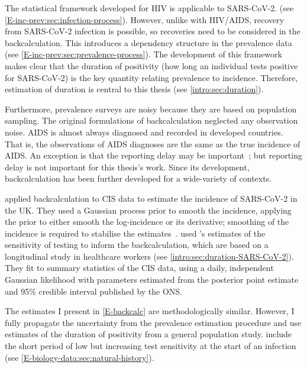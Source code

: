 \documentclass[thesis.tex]{subfiles}
\begin{document}
The statistical framework developed for HIV is applicable to SARS-CoV-2.
(see \cref{E-inc-prev:sec:infection-process}).
However, unlike with HIV/AIDS, recovery from SARS-CoV-2 infection is possible, so recoveries need to be considered in the backcalculation.
This introduces a dependency structure in the prevalence data (see \cref{E-inc-prev:sec:prevalence-process}).
The development of this framework makes clear that the duration of positivity (how long an individual tests positive for SARS-CoV-2) is the key quantity relating prevalence to incidence.
Therefore, estimation of duration is central to this thesis (see \cref{intro:sec:duration}).

Furthermore, prevalence surveys are noisy because they are based on population sampling.
The original formulations of backcalculation neglected any observation noise.
AIDS is almost always diagnosed and recorded in developed countries.
That is, the observations of AIDS diagnoses are the same as the true incidence of AIDS.
An exception is that the reporting delay may be important~\autocite{paganoHIV}; but reporting delay is not important for this thesis's work.
Since its development, backcalculation has been further developed for a wide-variety of contexts.

\Textcite{abbottCISincidence} applied backcalculation to CIS data to estimate the incidence of SARS-CoV-2 in the UK.
They used a Gaussian process prior to smooth the incidence, applying the prior to either smooth the log-incidence or its derivative; smoothing of the incidence is required to stabilise the estimates~\autocite{brookmeyerBackcalculation}.
\Textcite{abbottCISincidence} used \textcite{hellewellPCRSensitivity}'s estimates of the sensitivity of testing to inform the backcalculation, which are based on a longitudinal study in healthcare workers (see \cref{intro:sec:duration-SARS-CoV-2}).
They fit to summary statistics of the CIS data, using a daily, independent Gaussian likelihood with parameters estimated from the posterior point estimate and 95\% credible interval published by the ONS.

The estimates I present in \cref{E-backcalc} are methodologically similar.
However, I fully propagate the uncertainty from the prevalence estimation procedure and use estimates of the duration of positivity from a general population study.
\Textcite{abbottCISincidence} include the short period of low but increasing test sensitivity at the start of an infection (see \cref{E-biology-data:sec:natural-history}).
\end{document}

